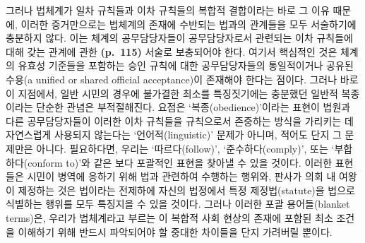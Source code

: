 그러나 법체계가 일차 규칙들과 이차 규칙들의 복합적 결합이라는 바로 그
이유 때문에, 이러한 증거만으로는 법체계의 존재에 수반되는 법과의
관계들을 모두 서술하기에 충분하지 않다. 이는 체계의 공무담당자들이
공무담당자로서 관련되는 이차 규칙들에 대해 갖는 관계에 관한
\textbf{(p.~115)} 서술로 보충되어야 한다. 여기서 핵심적인 것은 체계의
유효성 기준들을 포함하는 승인 규칙에 대한 공무담당자들의 통일적이거나
공유된 수용(a unified or shared official acceptance)이 존재해야 한다는
점이다. 그러나 바로 이 지점에서, 일반 시민의 경우에 불가결한 최소를
특징짓기에는 충분했던 일반적 복종이라는 단순한 관념은 부적절해진다.
요점은 ‘복종(obedience)’이라는 표현이 법원과 다른 공무담당자들이 이러한
이차 규칙들을 규칙으로서 존중하는 방식을 가리키는 데 자연스럽게 사용되지
않는다는 ‘언어적(linguistic)’ 문제가 아니며, 적어도 단지 그 문제만은
아니다. 필요하다면, 우리는 ‘따르다(follow)’, ‘준수하다(comply)’, 또는
‘부합하다(conform to)’와 같은 보다 포괄적인 표현을 찾아낼 수 있을
것이다. 이러한 표현들은 시민이 병역에 응하기 위해 법과 관련하여 수행하는
행위와, 판사가 의회 내 여왕이 제정하는 것은 법이라는 전제하에 자신의
법정에서 특정 제정법(statute)을 법으로 식별하는 행위를 모두 특징지을 수
있을 것이다. 그러나 이러한 포괄 용어들(blanket terms)은, 우리가
법체계라고 부르는 이 복합적 사회 현상의 존재에 포함된 최소 조건을
이해하기 위해 반드시 파악되어야 할 중대한 차이들을 단지 가려버릴 뿐이다.

